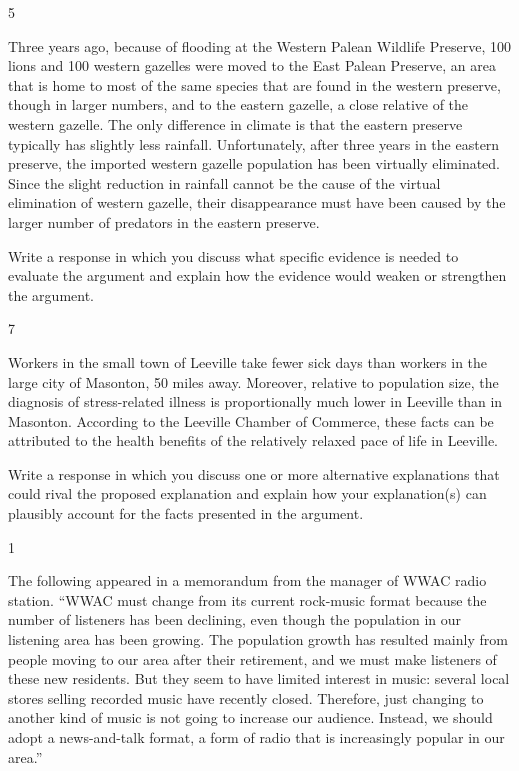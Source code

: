 \documentclass[]{article}
\begin{document}
5

Three years ago, because of flooding at the Western Palean Wildlife
Preserve, 100 lions and 100 western gazelles were moved to the East
Palean Preserve, an area that is home to most of the same species that
are found in the western preserve, though in larger numbers, and to the
eastern gazelle, a close relative of the western gazelle. The only
difference in climate is that the eastern preserve typically has
slightly less rainfall. Unfortunately, after three years in the eastern
preserve, the imported western gazelle population has been virtually
eliminated. Since the slight reduction in rainfall cannot be the cause
of the virtual elimination of western gazelle, their disappearance must
have been caused by the larger number of predators in the eastern
preserve.

Write a response in which you discuss what specific evidence is needed
to evaluate the argument and explain how the evidence would weaken or
strengthen the argument.

7

Workers in the small town of Leeville take fewer sick days than workers
in the large city of Masonton, 50 miles away. Moreover, relative to
population size, the diagnosis of stress-related illness is
proportionally much lower in Leeville than in Masonton. According to the
Leeville Chamber of Commerce, these facts can be attributed to the
health benefits of the relatively relaxed pace of life in Leeville.

Write a response in which you discuss one or more alternative
explanations that could rival the proposed explanation and explain how
your explanation(s) can plausibly account for the facts presented in the
argument.

1

The following appeared in a memorandum from the manager of WWAC radio
station. ``WWAC must change from its current rock-music format because
the number of listeners has been declining, even though the population
in our listening area has been growing. The population growth has
resulted mainly from people moving to our area after their retirement,
and we must make listeners of these new residents. But they seem to have
limited interest in music: several local stores selling recorded music
have recently closed. Therefore, just changing to another kind of music
is not going to increase our audience. Instead, we should adopt a
news-and-talk format, a form of radio that is increasingly popular in
our area.''
\end{document}
